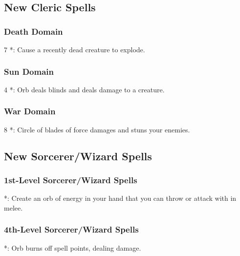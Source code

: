 \subsection{New Cleric Spells}
\subsubsection{Death Domain}
\begin{list}{}{\leftmargin=1em}
 \item[7] *: Cause a recently dead creature to explode.
\end{list}
\subsubsection{Sun Domain}
\begin{list}{}{\leftmargin=1em}
 \item[4] *: Orb deals blinds and deals damage to a creature.
\end{list}
\subsubsection{War Domain}
\begin{list}{}{\leftmargin=1em}
 \item[8] *: Circle of blades of force damages and stuns your enemies.
\end{list}



\subsection{New Sorcerer/Wizard Spells}
\subsubsection{1st-Level Sorcerer/Wizard Spells}
\begin{list}{}{\leftmargin=1em}
\item {}*: Create an orb of energy in your hand that you can throw or attack with in melee.
\end{list}

\subsubsection{4th-Level Sorcerer/Wizard Spells}
\begin{list}{}{\leftmargin=1em}
\item {}*: Orb burns off spell points, dealing damage.
\end{list}


